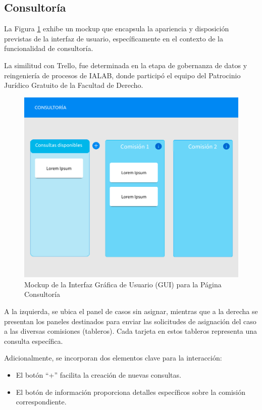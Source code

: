 \subsection{Consultoría}

La Figura \ref{fig:gui-consultancy} exhibe un mockup que encapsula la apariencia y disposición previstas de la interfaz de usuario, específicamente en el contexto de la funcionalidad de consultoría.

La similitud con Trello, fue determinada en la etapa de gobernanza de datos y reingeniería de procesos de IALAB, donde participó el equipo del Patrocinio Jurídico Gratuito de la Facultad de Derecho.

\begin{figure}[h]
\centering
\includegraphics[width=1\linewidth]{fig/GUI-consultancy.png}
\caption{Mockup de la Interfaz Gráfica de Usuario (GUI) para la Página Consultoría}
\label{fig:gui-consultancy}
\end{figure}


A la izquierda, se ubica el panel de casos sin asignar, mientras que a la derecha se presentan los paneles destinados para enviar las solicitudes de asignación del caso a las diversas comisiones (tableros). Cada tarjeta en estos tableros representa una consulta específica.

Adicionalmente, se incorporan dos elementos clave para la interacción:
\begin{itemize}
    \item El botón ``+''  facilita la creación de nuevas consultas.
    \item El botón de información proporciona detalles específicos sobre la comisión correspondiente.
\end{itemize}



